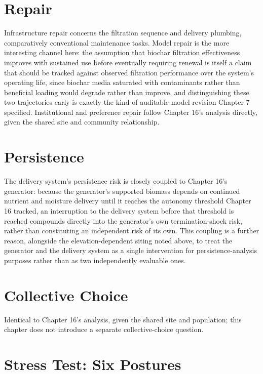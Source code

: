 \documentclass[11pt,oneside]{book}
\begin{document}
\section*{Repair}

Infrastructure repair concerns the filtration sequence and delivery plumbing, comparatively conventional maintenance tasks. Model repair is the more interesting channel here: the assumption that biochar filtration effectiveness improves with sustained use before eventually requiring renewal is itself a claim that should be tracked against observed filtration performance over the system's operating life, since biochar media saturated with contaminants rather than beneficial loading would degrade rather than improve, and distinguishing these two trajectories early is exactly the kind of auditable model revision Chapter 7 specified. Institutional and preference repair follow Chapter 16's analysis directly, given the shared site and community relationship.

\section*{Persistence}

The delivery system's persistence risk is closely coupled to Chapter 16's generator: because the generator's supported biomass depends on continued nutrient and moisture delivery until it reaches the autonomy threshold Chapter 16 tracked, an interruption to the delivery system before that threshold is reached compounds directly into the generator's own termination-shock risk, rather than constituting an independent risk of its own. This coupling is a further reason, alongside the elevation-dependent siting noted above, to treat the generator and the delivery system as a single intervention for persistence-analysis purposes rather than as two independently evaluable ones.

\section*{Collective Choice}

Identical to Chapter 16's analysis, given the shared site and population; this chapter does not introduce a separate collective-choice question.

\section*{Stress Test: Six Postures}
\end{document}

